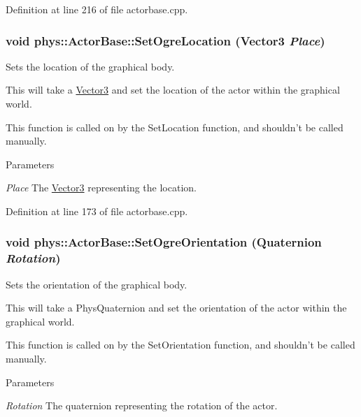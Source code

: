 Definition at line 216 of file actorbase.cpp.

\hypertarget{classphys_1_1ActorBase_a192ced7c3191f3f9d4921aad73952046}{
\subsubsection[{SetOgreLocation}]{\setlength{\rightskip}{0pt plus 5cm}void phys::ActorBase::SetOgreLocation ({\bf Vector3} {\em Place})}}
\label{d8/d0f/classphys_1_1ActorBase_a192ced7c3191f3f9d4921aad73952046}


Sets the location of the graphical body. 

This will take a \hyperlink{classphys_1_1Vector3}{Vector3} and set the location of the actor within the graphical world. \par
 This function is called on by the SetLocation function, and shouldn't be called manually. 
\begin{DoxyParams}{Parameters}
\item[{\em Place}]The \hyperlink{classphys_1_1Vector3}{Vector3} representing the location. \end{DoxyParams}


Definition at line 173 of file actorbase.cpp.

\hypertarget{classphys_1_1ActorBase_a7b2d13cb1e8bba60eeae782a53fd5e49}{
\subsubsection[{SetOgreOrientation}]{\setlength{\rightskip}{0pt plus 5cm}void phys::ActorBase::SetOgreOrientation ({\bf Quaternion} {\em Rotation})}}
\label{d8/d0f/classphys_1_1ActorBase_a7b2d13cb1e8bba60eeae782a53fd5e49}


Sets the orientation of the graphical body. 

This will take a PhysQuaternion and set the orientation of the actor within the graphical world. \par
 This function is called on by the SetOrientation function, and shouldn't be called manually. 
\begin{DoxyParams}{Parameters}
\item[{\em Rotation}]The quaternion representing the rotation of the actor. \end{DoxyParams}



